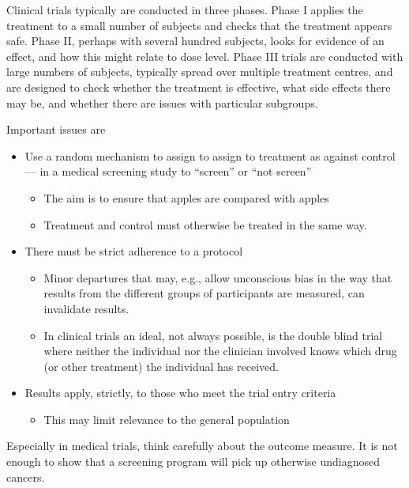 \documentclass[
  10pt,
  b5paper]{book}
\providecommand{\tightlist}{%
  \setlength{\itemsep}{0pt}\setlength{\parskip}{0pt}}
\begin{document}
Clinical trials typically are conducted in three phases. Phase I applies
the treatment to a small number of subjects and checks that the
treatment appears safe. Phase II, perhaps with several hundred subjects,
looks for evidence of an effect, and how this might relate to dose
level. Phase III trials are conducted with large numbers of subjects,
typically spread over multiple treatment centres, and are designed to
check whether the treatment is effective, what side effects there may
be, and whether there are issues with particular subgroups.

Important issues are

\begin{itemize}
\tightlist
\item
  Use a random mechanism to assign to assign to treatment as against
  control --- in a medical screening study to ``screen'' or ``not screen''

  \begin{itemize}
  \tightlist
  \item
    The aim is to ensure that apples are compared with apples
  \item
    Treatment and control must otherwise be treated in the same way.
  \end{itemize}
\item
  There must be strict adherence to a protocol

  \begin{itemize}
  \tightlist
  \item
    Minor departures that may, e.g., allow unconscious bias in the
    way that results from the different groups of participants are
    measured, can invalidate results.
  \item
    In clinical trials an ideal, not always possible, is the double
    blind trial where neither the individual nor the clinician
    involved knows which drug (or other treatment) the individual
    has received.
  \end{itemize}
\item
  Results apply, strictly, to those who meet the trial entry criteria

  \begin{itemize}
  \tightlist
  \item
    This may limit relevance to the general population
  \end{itemize}
\end{itemize}

Especially in medical trials, think carefully about the outcome measure.
It is not enough to show that a screening program will pick up otherwise
undiagnosed cancers.
\end{document}
